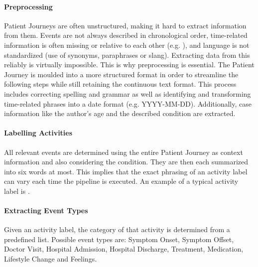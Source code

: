 \paragraph{Preprocessing} Patient Journeys are often unstructured, making it hard to extract information from them. Events are not always described in chronological order, time-related information is often missing or relative to each other (e.g. ), and language is not standardized (use of synonyms, paraphrases or slang). Extracting data from this reliably is virtually impossible. This is why preprocessing is essential. The Patient Journey is moulded into a more structured format in order to streamline the following steps while still retaining the continuous text format. This process includes correcting spelling and grammar as well as identifying and transforming time-related phrases into a date format (e.g. YYYY-MM-DD). Additionally, case information like the author's age and the described condition are extracted.
\paragraph{Labelling Activities} All relevant events are determined using the entire Patient Journey as context information and also considering the condition. They are then each summarized into six words at most. This implies that the exact phrasing of an activity label can vary each time the pipeline is executed. An example of a typical activity label is .
\paragraph{Extracting Event Types} Given an activity label, the category of that activity is determined from a predefined list. Possible event types are: Symptom Onset, Symptom Offset, Doctor Visit, Hospital Admission, Hospital Discharge, Treatment, Medication, Lifestyle Change and Feelings.
